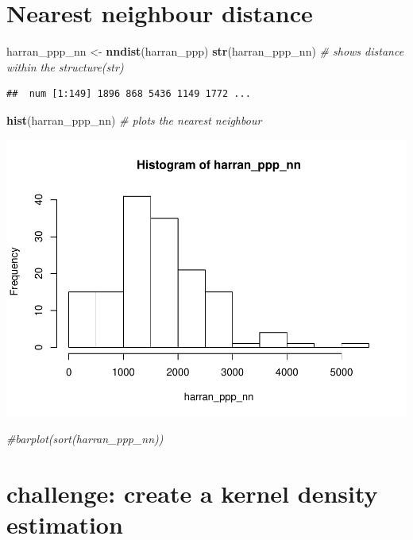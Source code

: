 \documentclass[]{article}
\newenvironment{Shaded}{\begin{snugshade}}{\end{snugshade}}
\newcommand{\KeywordTok}[1]{\textcolor[rgb]{0.13,0.29,0.53}{\textbf{{#1}}}}
\newcommand{\StringTok}[1]{\textcolor[rgb]{0.31,0.60,0.02}{{#1}}}
\newcommand{\CommentTok}[1]{\textcolor[rgb]{0.56,0.35,0.01}{\textit{{#1}}}}
\newcommand{\NormalTok}[1]{{#1}}
\begin{document}
\section{Nearest neighbour distance}\label{nearest-neighbour-distance}

\begin{Shaded}
\begin{Highlighting}[]
\NormalTok{harran_ppp_nn <-}\StringTok{ }\KeywordTok{nndist}\NormalTok{(harran_ppp)}
\KeywordTok{str}\NormalTok{(harran_ppp_nn) }\CommentTok{# shows distance within the structure(str)}
\end{Highlighting}
\end{Shaded}

\begin{verbatim}
##  num [1:149] 1896 868 5436 1149 1772 ...
\end{verbatim}

\begin{Shaded}
\begin{Highlighting}[]
\KeywordTok{hist}\NormalTok{(harran_ppp_nn)  }\CommentTok{# plots the nearest neighbour}
\end{Highlighting}
\end{Shaded}

\includegraphics{HarranPlain_files/figure-latex/unnamed-chunk-4-1.pdf}

\begin{Shaded}
\begin{Highlighting}[]
\CommentTok{#barplot(sort(harran_ppp_nn))}
\end{Highlighting}
\end{Shaded}

\section{challenge: create a kernel density
estimation}\label{challenge-create-a-kernel-density-estimation}
\end{document}
